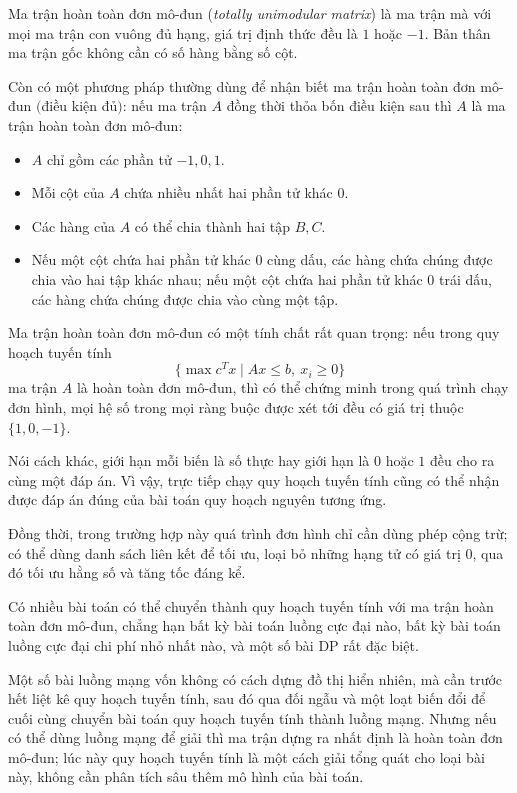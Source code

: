 \documentclass[11pt]{article}
\begin{document}
Ma trận hoàn toàn đơn mô-đun (\emph{totally unimodular matrix}) là ma trận mà
với mọi ma trận con vuông đủ hạng, giá trị định thức đều là \(1\) hoặc
\(-1\). Bản thân ma trận gốc không cần có số hàng bằng số cột.

Còn có một phương pháp thường dùng để nhận biết ma trận hoàn toàn đơn mô-đun
\((\)điều kiện đủ\()\): nếu ma trận \(A\) đồng thời thỏa bốn điều kiện sau thì
\(A\) là ma trận hoàn toàn đơn mô-đun:
\begin{itemize}
  \item \(A\) chỉ gồm các phần tử \(-1,0,1\).
  \item Mỗi cột của \(A\) chứa nhiều nhất hai phần tử khác \(0\).
  \item Các hàng của \(A\) có thể chia thành hai tập \(B,C\).
  \item Nếu một cột chứa hai phần tử khác \(0\) cùng dấu, các hàng chứa chúng
  được chia vào hai tập khác nhau; nếu một cột chứa hai phần tử khác \(0\)
  trái dấu, các hàng chứa chúng được chia vào cùng một tập.
\end{itemize}

Ma trận hoàn toàn đơn mô-đun có một tính chất rất quan trọng: nếu trong quy
hoạch tuyến tính
\[
  \{\max c^Tx\mid Ax\le b,\ x_i\ge 0\}
\]
ma trận \(A\) là hoàn toàn đơn mô-đun, thì có thể chứng minh trong quá trình
chạy đơn hình, mọi hệ số trong mọi ràng buộc được xét tới đều có giá trị
thuộc \(\{1,0,-1\}\).

Nói cách khác, giới hạn mỗi biến là số thực hay giới hạn là \(0\) hoặc \(1\)
đều cho ra cùng một đáp án. Vì vậy, trực tiếp chạy quy hoạch tuyến tính cũng
có thể nhận được đáp án đúng của bài toán quy hoạch nguyên tương ứng.

Đồng thời, trong trường hợp này quá trình đơn hình chỉ cần dùng phép cộng
trừ; có thể dùng danh sách liên kết để tối ưu, loại bỏ những hạng tử có giá
trị \(0\), qua đó tối ưu hằng số và tăng tốc đáng kể.

Có nhiều bài toán có thể chuyển thành quy hoạch tuyến tính với ma trận hoàn
toàn đơn mô-đun, chẳng hạn bất kỳ bài toán luồng cực đại nào, bất kỳ bài toán
luồng cực đại chi phí nhỏ nhất nào, và một số bài DP rất đặc biệt.

Một số bài luồng mạng vốn không có cách dựng đồ thị hiển nhiên, mà cần trước
hết liệt kê quy hoạch tuyến tính, sau đó qua đối ngẫu và một loạt biến đổi để
cuối cùng chuyển bài toán quy hoạch tuyến tính thành luồng mạng. Nhưng nếu có
thể dùng luồng mạng để giải thì ma trận dựng ra nhất định là hoàn toàn đơn
mô-đun; lúc này quy hoạch tuyến tính là một cách giải tổng quát cho loại bài
này, không cần phân tích sâu thêm mô hình của bài toán.
\end{document}
